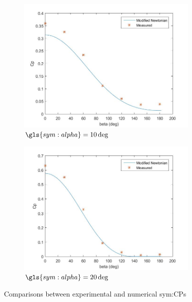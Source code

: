 \begin{figure}[h]
	\centering
	\begin{subfigure}[b]{0.49\textwidth}
		\includegraphics[width=0.96\textwidth]{./Figure/cone30deg_alpha10}
		\caption{$\gls{sym:alpha}=10\deg$}
		\label{fig:CPconealpha10}
	\end{subfigure}
		\begin{subfigure}[b]{0.49\textwidth}
			\includegraphics[width=0.96\textwidth]{./Figure/cone30deg_alpha20}
		\caption{$\gls{sym:alpha}=20\deg$}
		\label{fig:CPconealpha20}
	\end{subfigure}
	\caption{Comparisons between experimental and numerical \glspl{sym:CP}}
	\label{fig:CPcone30val}
\end{figure}

